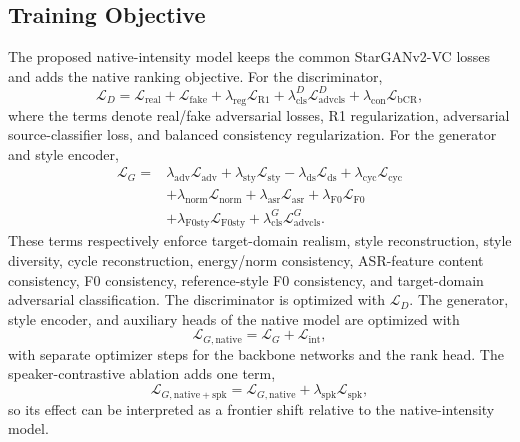 \subsection{Training Objective}
The proposed native-intensity model keeps the common StarGANv2-VC losses and adds the native ranking objective.
For the discriminator,
\begin{equation}
\mathcal{L}_{D}
=
\mathcal{L}_{\mathrm{real}}
+
\mathcal{L}_{\mathrm{fake}}
+
\lambda_{\mathrm{reg}}\mathcal{L}_{\mathrm{R1}}
+
\lambda_{\mathrm{cls}}^{D}\mathcal{L}_{\mathrm{advcls}}^{D}
+
\lambda_{\mathrm{con}}\mathcal{L}_{\mathrm{bCR}} ,
\end{equation}
where the terms denote real/fake adversarial losses, R1 regularization, adversarial source-classifier loss, and balanced consistency regularization.
For the generator and style encoder,
\begin{align}
\mathcal{L}_{G}
=&
\lambda_{\mathrm{adv}}\mathcal{L}_{\mathrm{adv}}
+
\lambda_{\mathrm{sty}}\mathcal{L}_{\mathrm{sty}}
-
\lambda_{\mathrm{ds}}\mathcal{L}_{\mathrm{ds}}
+
\lambda_{\mathrm{cyc}}\mathcal{L}_{\mathrm{cyc}}
\nonumber\\
&
+
\lambda_{\mathrm{norm}}\mathcal{L}_{\mathrm{norm}}
+
\lambda_{\mathrm{asr}}\mathcal{L}_{\mathrm{asr}}
+
\lambda_{\mathrm{F0}}\mathcal{L}_{\mathrm{F0}}
\nonumber\\
&
+
\lambda_{\mathrm{F0sty}}\mathcal{L}_{\mathrm{F0sty}}
+
\lambda_{\mathrm{cls}}^{G}\mathcal{L}_{\mathrm{advcls}}^{G}.
\end{align}
These terms respectively enforce target-domain realism, style reconstruction, style diversity, cycle reconstruction, energy/norm consistency, ASR-feature content consistency, F0 consistency, reference-style F0 consistency, and target-domain adversarial classification.
The discriminator is optimized with $\mathcal{L}_{D}$.
The generator, style encoder, and auxiliary heads of the native model are optimized with
\begin{equation}
\mathcal{L}_{G,\mathrm{native}} =
\mathcal{L}_{G}
+
\mathcal{L}_{\mathrm{int}},
\end{equation}
with separate optimizer steps for the backbone networks and the rank head.
The speaker-contrastive ablation adds one term,
\begin{equation}
\mathcal{L}_{G,\mathrm{native+spk}} =
\mathcal{L}_{G,\mathrm{native}}
+
\lambda_{\mathrm{spk}}\mathcal{L}_{\mathrm{spk}},
\end{equation}
so its effect can be interpreted as a frontier shift relative to the native-intensity model.

